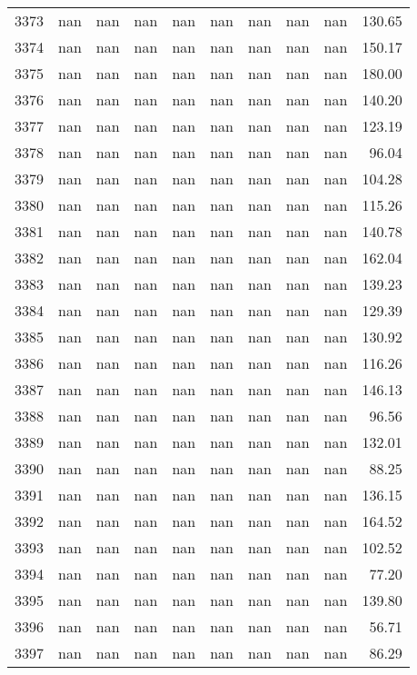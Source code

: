 \begin{tabular}{lrrrrrrrrr}
3373 & nan & nan & nan & nan & nan & nan & nan & nan & 130.65 \\
3374 & nan & nan & nan & nan & nan & nan & nan & nan & 150.17 \\
3375 & nan & nan & nan & nan & nan & nan & nan & nan & 180.00 \\
3376 & nan & nan & nan & nan & nan & nan & nan & nan & 140.20 \\
3377 & nan & nan & nan & nan & nan & nan & nan & nan & 123.19 \\
3378 & nan & nan & nan & nan & nan & nan & nan & nan & 96.04 \\
3379 & nan & nan & nan & nan & nan & nan & nan & nan & 104.28 \\
3380 & nan & nan & nan & nan & nan & nan & nan & nan & 115.26 \\
3381 & nan & nan & nan & nan & nan & nan & nan & nan & 140.78 \\
3382 & nan & nan & nan & nan & nan & nan & nan & nan & 162.04 \\
3383 & nan & nan & nan & nan & nan & nan & nan & nan & 139.23 \\
3384 & nan & nan & nan & nan & nan & nan & nan & nan & 129.39 \\
3385 & nan & nan & nan & nan & nan & nan & nan & nan & 130.92 \\
3386 & nan & nan & nan & nan & nan & nan & nan & nan & 116.26 \\
3387 & nan & nan & nan & nan & nan & nan & nan & nan & 146.13 \\
3388 & nan & nan & nan & nan & nan & nan & nan & nan & 96.56 \\
3389 & nan & nan & nan & nan & nan & nan & nan & nan & 132.01 \\
3390 & nan & nan & nan & nan & nan & nan & nan & nan & 88.25 \\
3391 & nan & nan & nan & nan & nan & nan & nan & nan & 136.15 \\
3392 & nan & nan & nan & nan & nan & nan & nan & nan & 164.52 \\
3393 & nan & nan & nan & nan & nan & nan & nan & nan & 102.52 \\
3394 & nan & nan & nan & nan & nan & nan & nan & nan & 77.20 \\
3395 & nan & nan & nan & nan & nan & nan & nan & nan & 139.80 \\
3396 & nan & nan & nan & nan & nan & nan & nan & nan & 56.71 \\
3397 & nan & nan & nan & nan & nan & nan & nan & nan & 86.29 \\

\end{tabular}
